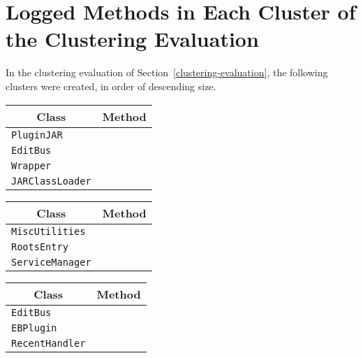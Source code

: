 
\chapter{Logged Methods in Each Cluster of the Clustering Evaluation}\label{append}

In the clustering evaluation of Section~\ref{clustering-evaluation}, the following clusters were created, in order of descending size.

\begin{center}
\begin{tabular}{ll}\toprule
\multicolumn{1}{c}{Class}&\multicolumn{1}{c}{Method}\\\midrule
\lstinline/PluginJAR/&\raisebox{0pt}{\lstinline/generateCache()/}\\
\lstinline/EditBus/&\raisebox{0pt}{\lstinline/send(EBMessage)/}\\
\lstinline/Wrapper/&\raisebox{0pt}{\lstinline/actionPerformed(ActionEvent)/}\\
\lstinline/JARClassLoader/&\raisebox{0pt}{\lstinline/loadClass(String,boolean)/}\\
\bottomrule
\end{tabular}
\end{center}

\begin{center}
\begin{tabular}{ll}\toprule
\multicolumn{1}{c}{Class}&\multicolumn{1}{c}{Method}\\\midrule
\lstinline/MiscUtilities/&\raisebox{0pt}{\lstinline/isSupportedEncoding(EBMessage)/}\\
\lstinline/RootsEntry/&\raisebox{0pt}{\lstinline/rootEntry(File)/}\\
\lstinline/ServiceManager/&\raisebox{0pt}{\lstinline/loadServices(PluginJAR,URL,PluginCacheEntry)/}\\
\bottomrule
\end{tabular}
\end{center}

\begin{center}
\begin{tabular}{ll}\toprule
\multicolumn{1}{c}{Class}&\multicolumn{1}{c}{Method}\\\midrule
\lstinline/EditBus/&\raisebox{0pt}{\lstinline/send(EBMessage)* /}\\
\lstinline/EBPlugin/&\raisebox{0pt}{\lstinline/handleMessage(EBMessage )/}\\
\lstinline/RecentHandler/&\raisebox{0pt}{\lstinline/doctypeDecl(String,String,String)/}\\
\bottomrule
\end{tabular}
\end{center}
